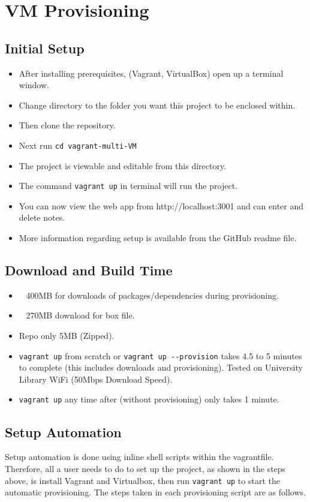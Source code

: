 \documentclass[12pt]{extarticle}
\begin{document}
\section{VM Provisioning}
\subsection{Initial Setup}
\begin{itemize}
\item After installing prerequisites, (Vagrant, VirtualBox) open up a terminal window.
\item Change directory to the folder you want this project to be enclosed within.
\item Then clone the repository.
\item Next run  \lstinline|cd vagrant-multi-VM|
\item The project is viewable and editable from this directory.
\item The command  \lstinline|vagrant up| in terminal will run the project.
\item You can now view the web app from http://localhost:3001 and can enter and delete notes.
\item More information regarding setup is available from the GitHub readme file.
\end{itemize}

\subsection{Download and Build Time}
\begin{itemize}
\item ~ 400MB for downloads of packages/dependencies during provisioning.
\item ~ 270MB download for box file.
\item Repo only 5MB (Zipped).
\item \lstinline|vagrant up| from scratch or \lstinline|vagrant up --provision| takes 4.5 to 5 minutes to complete (this includes downloads and provisioning). Tested on University Library WiFi (50Mbps Download Speed).
\item  \lstinline|vagrant up| any time after (without provisioning) only takes 1 minute.
\end{itemize}

\subsection{Setup Automation}
Setup automation is done using inline shell scripts within the vagrantfile. Therefore, all a user needs to do to set up the project, as shown in the steps above, is install Vagrant and Virtualbox, then run  \lstinline|vagrant up| to start the automatic provisioning. The steps taken in each provisioning script are as follows.
\end{document}
